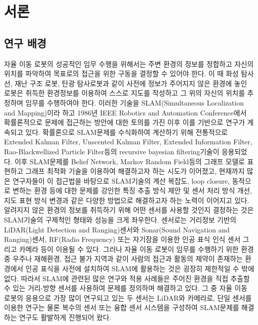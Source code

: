 \documentclass[master,korean,final]{cbnu-ecs}
\begin{document}
\begin{abstract}
\end{abstract}



\chapter{서론}
\section{연구 배경}

자율 이동 로봇의 성공적인 임무 수행을 위해서는 주변 환경의 정보를 정합하고 자신의 위치를 파악하여 목표로의 접근을 위한 구동을 결정할 수 있어야 한다. 이 때 화성 탐사선, 재난 구조 로봇, 탄광 탐사로봇과 같이 사전에 정보가 주어지지 않은 환경에 놓인 로봇은 취득한 환경정보를 이용하여 스스로 지도를 작성하고 그 위의 자신의 위치를 추정하며 임무를 수행하여야 한다. 이러한 기술을 SLAM(Simultaneous Localization and Mapping)이라 하고 1986년 IEEE Robotics and Automation Conference에서 확률론적으로 문제에 접근하는 방안에 대한 토의를 가진 이후 이를 기반으로 연구가 계속되고 있다\cite{Durrant2006}. 확률론으로 SLAM문제를 수식화하여 계산하기 위해 전통적으로 Extended Kalman Filter\cite{Dissanayake2000}, Unscented Kalman Filter\cite{Martinez2005}, Extended Information Filter\cite{Thrun2003}, Rao-Blackwellized Particle Filter\cite{Montemerlo2002}등의 recursive bayesian filtering기술이 응용되었다. 이후 SLAM문제를 Belief Network, Markov Random Field등의 그래프 모델로 표현하고 그래프 최적화 기술을 이용하여 해결하고자 하는 시도가 이어졌고\cite{Kummerle2011}, 
현재까지 많은 연구자들이 이 접근법을 바탕으로 SLAM기술의 계산 복잡도, loop closure, 동적으로 변하는 환경 등에 대한 문제를 강인한 특징 추출 방식 제안 및 센서 처리 방식 개선, 지도 표현 방식 변경과 같은 다양한 방법으로 해결하고자 하는 노력이 이어지고 있다.\\
알려지지 않은 환경의 정보를 취득하기 위해 어떤 센서를 사용할 것인지 결정하는 것은 SLAM기술의 구제척인 형태와 성능을 크게 좌우한다. 센서로는 거리정보 기반의 LiDAR(Light Detection and Ranging)센서와 Sonar(Sound Navigation and Ranging)센서, RF(Radio Frequency) 또는 자기장을 이용한 인공 표식 인식 센서 그리고 카메라 등이 이용될 수 있다. 그러나 자율 이동 로봇이 임무를 수행하기 위한 환경 중 우주나 재해환경, 접근 불가 지역과 같이 사람의 접근과 활동의 제약이 존재하는 환경에서 인공 표식을 사전에 설치하여 SLAM에 활용하는 것은 굉장히 제한적일 수 밖에 없다. 따라서 SLAM에 관련된 많은 연구와 적용 사례들은 주어진 환경을 직접 추출할 수 있는 거리-방향 센서를 사용하여 문제를 정의하며 해결하고 있다. 그 중 자율 이동 로봇의 응용으로 가장 많이 연구되고 있는 두 센서는 LiDAR와 카메라로, 단일 센서를 이용한 연구는 물론 복수의 센서 또는 융합 센서 시스템을 구성하여 SLAM문제를 해결하는 연구도 활발하게 진행되어 왔다.\\
\end{document}
